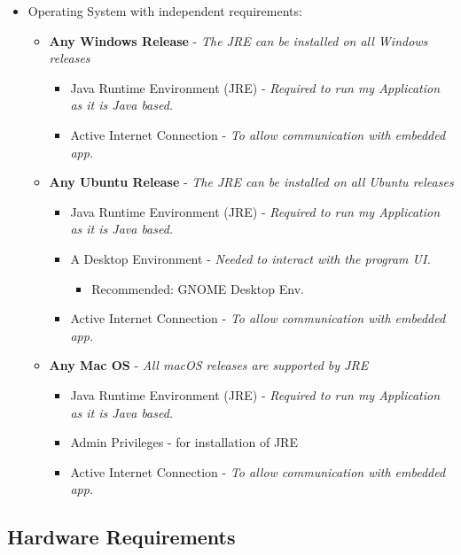 \documentclass[11pt]{report}
\begin{document}
		\begin{itemize}
			\item{Operating System with independent requirements:}
			\begin{itemize}
				\item{\textbf{Any Windows Release}} - \emph{The JRE can be installed on all Windows releases}
					\begin{itemize}
						\item{Java Runtime Environment (JRE)} - \emph{Required to run my Application as it is Java based.}
						\item{Active Internet Connection} - \emph{To allow communication with embedded app.}
					\end{itemize}
		
				\item{\textbf{Any Ubuntu Release}} - \emph{The JRE can be installed on all Ubuntu releases}
					\begin{itemize}
						\item{Java Runtime Environment (JRE)} - \emph{Required to run my Application as it is Java based.} 
						\item{A Desktop Environment} - \emph{Needed to interact with the program UI.}
						\begin{itemize}
							\item{Recommended: GNOME Desktop Env.}
						\end{itemize}
						\item{Active Internet Connection} - \emph{To allow communication with embedded app.}
					\end{itemize}	
			
				\item{\textbf{Any Mac OS}} - \emph{All macOS releases are supported by JRE}
					\begin{itemize}
						\item{Java Runtime Environment (JRE)} - \emph{Required to run my Application as it is Java based.} 
						\item{Admin Privileges - for installation of JRE}
						\item{Active Internet Connection} - \emph{To allow communication with embedded app.}
					\end{itemize}
				
			\end{itemize}
		\end{itemize}


	\subsection{Hardware Requirements}
\end{document}
